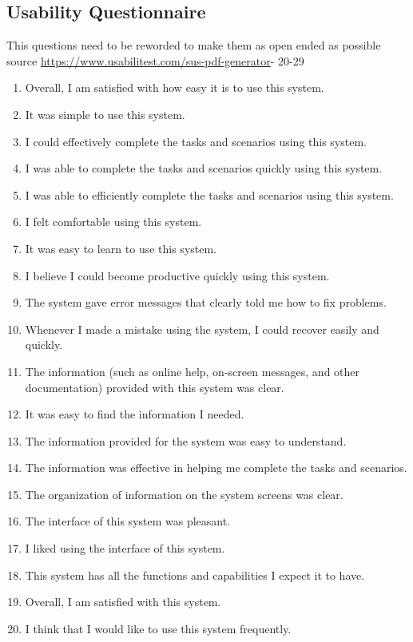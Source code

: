 \documentclass[letterpaper,cleveref]{lipics-v2019}
\theoremstyle{definition}
\begin{document}
\subsection{Usability Questionnaire}
This questions need to be reworded to make them as open ended as possible\\
source \url{https://www.usabilitest.com/sus-pdf-generator}- 20-29
\begin {enumerate}
\item Overall, I am satisfied with how easy it is to use this system.
\item It was simple to use this system.
\item I could effectively complete the tasks and scenarios using this system.
\item I was able to complete the tasks and scenarios quickly using this system.
\item I was able to efficiently complete the tasks and scenarios using this system.
\item I felt comfortable using this system.
\item It was easy to learn to use this system.
\item I believe I could become productive quickly using this system.
\item The system gave error messages that clearly told me how to fix problems.
\item Whenever I made a mistake using the system, I could recover easily and quickly.
\item The information (such as online help, on-screen messages, and other documentation) provided with this system was clear.
\item It was easy to find the information I needed.
\item The information provided for the system was easy to understand.
\item The information was effective in helping me complete the tasks and scenarios.
\item The organization of information on the system screens was clear.
\item The interface of this system was pleasant.
\item I liked using the interface of this system.
\item This system has all the functions and capabilities I expect it to have.
\item Overall, I am satisfied with this system.
\item I think that I would like to use this system frequently.

\end{enumerate}
\end{document}
